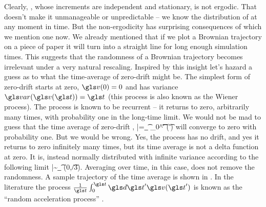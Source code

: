 Clearly, \BM, whose increments are independent and stationary, is not ergodic. That doesn't make it
unmanageable or unpredictable -- we know the distribution of \BM at any moment in time. But the non-ergodicity
has surprising consequences of which we mention one now. We already mentioned
that if we plot a Brownian trajectory on a piece of paper it will turn into a straight line for long enough
simulation times. This suggests that the randomness of a Brownian trajectory becomes irrelevant
under a very natural rescaling. Inspired by this insight let's hazard a guess as to what 
the time-average of zero-drift \BM might be. The simplest form of zero-drift \BM starts at zero, $\gv(0)=0$
and has variance $\var(\gv(\t))=\t$ (this process is also known as the Wiener process). The process is 
known to be recurrent -- it returns to zero, arbitrarily many times, with probability one in the 
long-time limit. We would not be mad to guess that the time average of zero-drift \BM,
\be
\bar{\gv}=\lim_{\t\to\infty} \int_0^\t \gd\t' \gv(\t')
\ee
will converge to zero with probability one. But we would be wrong. Yes, the process has no drift, and
yes it returns to zero infinitely many times, but its time average is not a delta function at zero.
It is, instead normally distributed with infinite variance according to the following limit
\be
\bar{\gv}\sim \lim_{\t\to\infty} \mN(0,\t/3).
\ee
Averaging over time, in this case, does not remove the randomness. A sample 
trajectory of the time average is shown in . In the literature the process 
$\frac{1}{\t}\int_0^\t \gd\t' \gv(\t')$ is known as the ``random acceleration process'' \cite{Burkhardt2007}.

